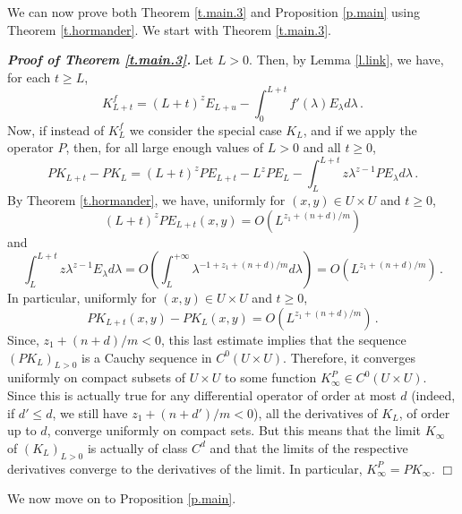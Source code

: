 \documentclass[10pt,twoside]{article}
\newenvironment{prf}[1][]
{\vskip 2mm  {\it \bf Proof#1. }}{$\Box$ \vskip 2mm}
\numberwithin{theorem}{section}
\begin{document}
We can now prove both Theorem \ref{t.main.3} and Proposition \ref{p.main} using Theorem \ref{t.hormander}. We start with Theorem \ref{t.main.3}.

\begin{prf}[ of Theorem \ref{t.main.3}]
Let $L>0$. Then, by Lemma \ref{l.link}, we have, for each $t\geq L$,
\[
K^f_{L+t}=(L+t)^z E_{L+u}-\int_0^{L+t}f'(\lambda)E_\lambda d\lambda\, .
\]
Now, if instead of $K^f_L$ we consider the special case $K_L$, and if we apply the operator $P$, then, for all large enough values of $L>0$ and all $t\geq 0$,
\[
PK_{L+t}-PK_L=(L+t)^zPE_{L+t}-L^zPE_L-\int_L^{L+t}z\lambda^{z-1}PE_\lambda d\lambda\, .
\]
By Theorem \ref{t.hormander}, we have, uniformly for $(x,y)\in U\times U$ and $t\geq 0$,
\[
(L+t)^zPE_{L+t}(x,y)=O\left(L^{z_1+(n+d)/m}\right)
\]
and
\[
\int_L^{L+t}z\lambda^{z-1}E_\lambda d\lambda=O\left(\int_L^{+\infty}\lambda^{-1+z_1+(n+d)/m}d\lambda\right)=O\left(L^{z_1+(n+d)/m}\right)\, .
\]
In particular, uniformly for $(x,y)\in U\times U$ and $t\geq 0$,
\[
PK_{L+t}(x,y)-PK_L(x,y) = O\left(L^{z_1+(n+d)/m}\right)\, .
\]
Since, $z_1+(n+d)/m<0$, this last estimate implies that the sequence $(PK_L)_{L> 0}$ is a Cauchy sequence in $C^0\left(U\times U\right)$. Therefore, it converges uniformly on compact subsets of $U\times U$ to some function $K_\infty^P\in C^0\left(U\times U\right)$. Since this is actually true for any differential operator of order at most $d$ (indeed, if $d'\leq d$, we still have $z_1+(n+d')/m<0$), all the derivatives of $K_L$, of order up to $d$, converge uniformly on compact sets. But this means that the limit $K_\infty$ of $\left(K_L\right)_{L>0}$ is actually of class $C^d$ and that the limits of the respective derivatives converge to the derivatives of the limit. In particular, $K_\infty^P=P K_\infty$.
\end{prf}

We now move on to Proposition \ref{p.main}.
\end{document}
